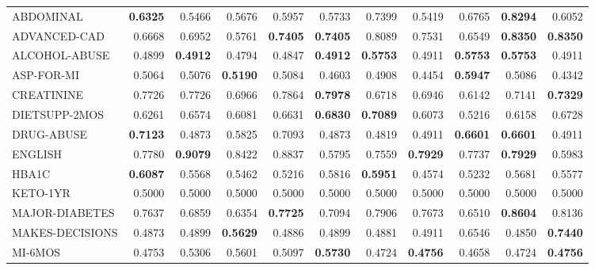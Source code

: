 \begin{table}[!t]
\begin{tabular}{lrrrrrrrrrr}
\textsf{ABDOMINAL}       & \textbf{0.6325} & 0.5466          & 0.5676          & 0.5957          & 0.5733          & 0.7399          & 0.5419          & 0.6765          & \textbf{0.8294} & 0.6052\\
\textsf{ADVANCED-CAD}    & 0.6668          & 0.6952          & 0.5761          & \textbf{0.7405} & \textbf{0.7405} & 0.8089          & 0.7531          & 0.6549          & \textbf{0.8350} & \textbf{0.8350}\\
\textsf{ALCOHOL-ABUSE}   & 0.4899          & \textbf{0.4912} & 0.4794          & 0.4847          & \textbf{0.4912} & \textbf{0.5753} & 0.4911          & \textbf{0.5753} & \textbf{0.5753} & 0.4911\\
\textsf{ASP-FOR-MI}      & 0.5064          & 0.5076          & \textbf{0.5190} & 0.5084          & 0.4603          & 0.4908          & 0.4454          & \textbf{0.5947} & 0.5086          & 0.4342\\
\textsf{CREATININE}      & 0.7726          & 0.7726          & 0.6966          & 0.7864          & \textbf{0.7978} & 0.6718          & 0.6946          & 0.6142          & 0.7141          & \textbf{0.7329}\\
\textsf{DIETSUPP-2MOS}   & 0.6261          & 0.6574          & 0.6081          & 0.6631          & \textbf{0.6830} & \textbf{0.7089} & 0.6073          & 0.5216          & 0.6158          & 0.6728\\
\textsf{DRUG-ABUSE}      & \textbf{0.7123} & 0.4873          & 0.5825          & 0.7093          & 0.4873          & 0.4819          & 0.4911          & \textbf{0.6601} & \textbf{0.6601} & 0.4911\\
\textsf{ENGLISH}         & 0.7780          & \textbf{0.9079} & 0.8422          & 0.8837          & 0.5795          & 0.7559          & \textbf{0.7929} & 0.7737          & \textbf{0.7929} & 0.5983\\
\textsf{HBA1C}           & \textbf{0.6087} & 0.5568          & 0.5462          & 0.5216          & 0.5816          & \textbf{0.5951} & 0.4574          & 0.5232          & 0.5681          & 0.5577\\
\textsf{KETO-1YR}        & 0.5000          & 0.5000          & 0.5000          & 0.5000          & 0.5000          & 0.5000          & 0.5000          & 0.5000          & 0.5000          & 0.5000\\
\textsf{MAJOR-DIABETES}  & 0.7637          & 0.6859          & 0.6354          & \textbf{0.7725} & 0.7094          & 0.7906          & 0.7673          & 0.6510          & \textbf{0.8604} & 0.8136\\
\textsf{MAKES-DECISIONS} & 0.4873          & 0.4899          & \textbf{0.5629} & 0.4886          & 0.4899          & 0.4881          & 0.4911          & 0.6546          & 0.4850          & \textbf{0.7440}\\
\textsf{MI-6MOS}         & 0.4753          & 0.5306          & 0.5601          & 0.5097          & \textbf{0.5730} & 0.4724          & \textbf{0.4756} & 0.4658          & 0.4724          & \textbf{0.4756}\\


\end{tabular}
\end{table}
